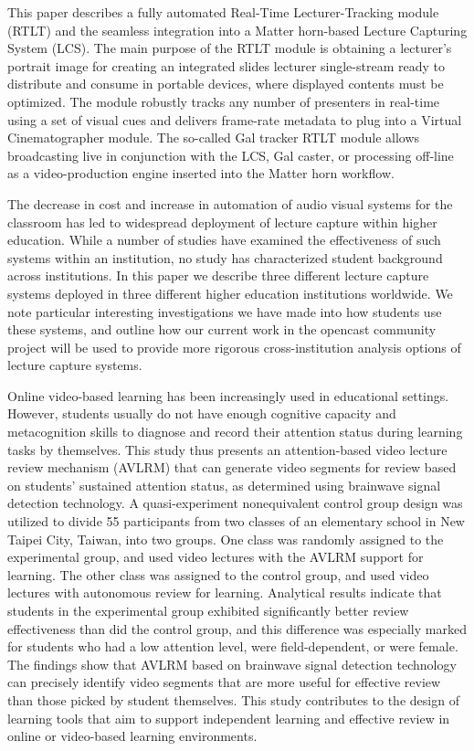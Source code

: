 This paper describes a fully automated Real-Time Lecturer-Tracking module (RTLT) and the seamless integration into a Matter horn-based Lecture Capturing System (LCS). The main purpose of the RTLT module is obtaining a lecturer's portrait image for creating an integrated slides lecturer single-stream ready to distribute and consume in portable devices, where displayed contents must be optimized. The module robustly tracks any number of presenters in real-time using a set of visual cues and delivers frame-rate metadata to plug into a Virtual Cinematographer module. The so-called Gal tracker RTLT module allows broadcasting live in conjunction with the LCS, Gal caster, or processing off-line as a video-production engine inserted into the Matter horn workflow. \cite{Gonzalez-Agulla2013}


The decrease in cost and increase in automation of audio visual systems for the classroom has led to widespread deployment of lecture capture within higher education. While a number of studies have examined the effectiveness of such systems within an institution, no study has characterized student background across institutions. In this paper we describe three different lecture capture systems deployed in three different higher education institutions worldwide. We note particular interesting investigations we have made into how students use these systems, and outline how our current work in the opencast community project will be used to provide more rigorous cross-institution analysis options of lecture capture systems.\cite{Barokas2010}


Online video-based learning has been increasingly used in educational settings. However, students usually do not have enough cognitive capacity and metacognition skills to diagnose and record their attention status during learning tasks by themselves. This study thus presents an attention-based video lecture review mechanism (AVLRM) that can generate video segments for review based on students’ sustained attention status, as determined using brainwave signal detection technology. A quasi-experiment nonequivalent control group design was utilized to divide 55 participants from two classes of an elementary school in New Taipei City, Taiwan, into two groups. One class was randomly assigned to the experimental group, and used video lectures with the AVLRM support for learning. The other class was assigned to the control group, and used video lectures with autonomous review for learning. Analytical results indicate that students in the experimental group exhibited significantly better review effectiveness than did the control group, and this difference was especially marked for students who had a low attention level, were field-dependent, or were female. The findings show that AVLRM based on brainwave signal detection technology can precisely identify video segments that are more useful for effective review than those picked by student themselves. This study contributes to the design of learning tools that aim to support independent learning and effective review in online or video-based learning environments.\cite{Lin2019}